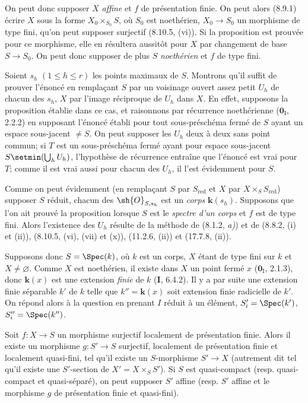 On peut donc supposer $X$ \emph{affine} et $f$ de présentation finie. On peut alors (8.9.1) écrire $X$ sous la forme $X_0\times_{S_0}S$, où $S_0$ est noethérien, $X_0\to S_0$ un morphisme de type fini, qu'on peut supposer surjectif (8.10.5, (vi)). Si la proposition est prouvée pour ce morphisme, elle en résultera aussitôt pour $X$ par changement de base $S\to S_0$. On peut donc supposer de plus $S$ \emph{noethérien} et $f$ de type fini.

Soient $s_h$ $(1\leq h\leq r)$ les points maximaux de $S$. Montrons qu'il suffit de prouver l'énoncé en remplaçant $S$ par un voisinage ouvert assez petit $U_h$ de chacun des $s_h$, $X$ par l'image réciproque de $U_h$ dans $X$. En effet, supposons la proposition établie dans ce cas, et raisonnons par récurrence noethérienne ($\mathbf{0}_{\mathrm I}$, 2.2.2) en supposant l'énoncé établi pour tout sous-préschéma fermé de $S$ ayant un espace sous-jacent $\neq S$. On peut supposer les $U_h$ deux à deux sans point commun; si $T$ est un sous-préschéma fermé ayant pour espace sous-jacent $S\setmin(\bigcup_h U_h)$, l'hypothèse de récurrence entraîne que l'énoncé est vrai pour $T$; comme il est vrai aussi pour chacun des $U_h$, il l'est évidemment pour $S$.

Comme on peut évidemment (en remplaçant $S$ par $S_{\mathrm{red}}$ et $X$ par $X\times_S S_{\mathrm{red}}$) supposer $S$ réduit, chacun des $\sh{O}_{S,s_h}$ est un \emph{corps} $\boldsymbol{k}(s_h)$. Supposons que l'on ait prouvé la proposition lorsque $S$ est le \emph{spectre d'un corps} et $f$ est de type fini. Alors l'existence des $U_h$ résulte de la méthode de (8.1.2, \emph{a)}) et de (8.8.2, (i) et (ii)), (8.10.5, (vi), (vii) et (x)), (11.2.6, (ii)) et (17.7.8, (ii)).

Supposons donc $S=\Spec(k)$, où $k$ est un corps, $X$ étant de type fini sur $k$ et $X\neq\varnothing$. Comme $X$ est noethérien, il existe dans $X$ un point fermé $x$ ($\mathbf{0}_{\mathrm I}$, 2.1.3), donc $\boldsymbol{k}(x)$ est une extension \emph{finie} de $k$ (\textbf{I}, 6.4.2). Il y a par suite une extension finie séparable $k'$ de $k$ telle que $k''=\boldsymbol{k}(x)$ soit extension finie radicielle de $k'$. On répond alors à la question en prenant $I$ réduit à un élément, $S_i'=\Spec(k')$, $S_i''=\Spec(k'')$.


\begin{corollary}[17.16.5]
\label{IV.17.16.5}
Soit $f:X\to S$ un morphisme surjectif localement de présentation finie. Alors il existe un morphisme $g:S'\to S$ surjectif, localement de présentation finie et \textup{localement quasi-fini}, tel qu'il existe un $S$-morphisme $S'\to X$ \textup{(autrement dit tel qu'il existe une} $S'$-section \textup{de} $X'=X\times_S S'$\textup{)}. Si $S$ est quasi-compact \textup{(resp.} quasi-compact et quasi-séparé\textup{)}, on peut supposer $S'$ affine \textup{(resp.} $S'$ affine et le morphisme $g$ de présentation finie et quasi-fini\textup{)}.
\end{corollary}

